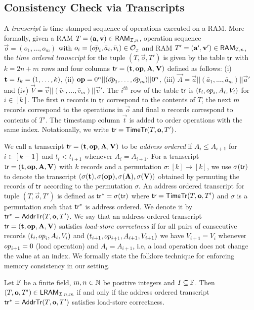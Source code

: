 \subsection{Consistency Check via Transcripts}\label{subsec:transcripts}
A {\em transcript} is time-stamped sequence of operations executed on a RAM.
More formally, given a RAM $T=(\mathbf{a},\mathbf{v})\in \mathsf{RAM}_{\mathcal{I}, {n}}$,
operation sequence $\vec{o}=(o_1,\ldots,o_m)$ with $o_i=(\bar{{op}_i},\bar{a}_i,\bar{v}_i)\in \mathcal{O}_{{}_\mathcal{I}}$ and RAM $T'=(\mathbf{a}', \mathbf{v}')\in \mathsf{RAM}_{\mathcal{I}, {n}}$,
the {\em time ordered transcript} for the tuple $(T,\vec{o},T')$ is given by the table $\mathsf{tr}$ with $k=2n+m$ rows and four columns
$\mathsf{tr} = (\mathbf{t},\mathbf{{op}},\mathbf{A},\mathbf{V})$  defined as follows: (i) $\mathbf{t}=I_{k}=(1,\ldots,k)$,
(ii) $\mathbf{{op}}=0^n||(\bar{{op}}_1,\ldots,\bar{{op}}_m)||0^n$,
(iii) $\vec{A}=\vec{a}||(\bar{a}_1,\ldots,\bar{a}_m)||\vec{a}'$ and
(iv) $\vec{V}=\vec{v}||(\bar{v}_1,\ldots,\bar{v}_m)||\vec{v}'$. The $i^{th}$ row of the table $\mathsf{tr}$ is
$(t_i,{op}_i,A_i,V_i)$ for $i\in [k]$. The first $n$ records in $\mathsf{tr}$ correspond to the contents of $T$,
the next $m$ records correspond to the operations in $\vec{o}$ and final $n$
records correspond to contents of $T'$. The timestamp column $\vec{t}$ is added to order operations with the same index.
Notationally, we write $\mathsf{tr}=\mathsf{TimeTr}(T,\mathbf{o},T')$.

We call a transcript $\mathsf{tr}=(\mathbf{t},\mathbf{{op}},\mathbf{A},\mathbf{V})$ to be {\em address ordered} if $A_i\leq A_{i+1}$ for $i\in [k-1]$ and
$t_i < t_{i+1}$ whenever $A_i=A_{i+1}$. For a transcript $\mathsf{tr}=(\mathbf{t},\mathbf{{op}},\mathbf{A},\mathbf{V})$ with $k$ records and a
permutation $\sigma:[k]\rightarrow [k]$, we use $\sigma(\mathsf{tr})$ to denote the transcript
$(\sigma(\mathbf{t}),\sigma(\mathbf{{op}}),\sigma(\mathbf{A}),\sigma(\mathbf{V}))$
obtained by permuting the records of $\mathsf{tr}$ according to the permutation $\sigma$.
An address ordered transcript for tuple $(T,\vec{o},T')$ is defined as $\mathsf{tr}^\ast=\sigma(\mathsf{tr})$ where $\mathsf{tr}=\mathsf{TimeTr}(T,\mathbf{o},T')$ and $\sigma$ is
a permutation such that $\mathsf{tr}^\ast$ is address ordered. We denote it by $\mathsf{tr}^\ast=\mathsf{AddrTr}(T,\mathbf{o},T')$.
We say that an address ordered transcript $\mathsf{tr}=(\mathbf{t},\mathbf{{op}},\mathbf{A},\mathbf{V})$ satisfies {\em load-store correctness}
if for all pairs of consecutive records $(t_i,{op}_i,A_i,V_i)$ and $(t_{i+1},{op}_{i+1},A_{i+1},V_{i+1})$ we have $V_{i+1}=V_i$
whenever ${op}_{i+1}=0$ (load operation) and
$A_i=A_{i+1}$, i.e, a load operation does not change the value at an index.
We formally state the folklore technique for enforcing memory consistency in our setting.
\begin{lemma}\label{lem:consistency-check}
Let $\mathbb{F}$ be a finite field, $m,n\in \mathbb{N}$ be positive integers and $I\subseteq \mathbb{F}$. Then $(T,\mathbf{o},T')\in \mathsf{LRAM}_{\mathcal{I},n,m}$ if and only if
    the address ordered transcript $\mathsf{tr}^\ast=\mathsf{AddrTr}(T,\mathbf{o},T')$ satisfies load-store correctness.
\end{lemma}

